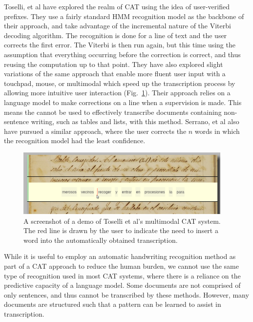 \documentclass[ms]{byuprop}
\begin{document}
Toselli, et al\cite{Toselli2007} have explored the realm of CAT using the idea of user-verified prefixes. They use a fairly standard HMM recognition model as the backbone of their approach, and take advantage of the incremental nature of the Viterbi decoding algorithm. The recognition is done for a line of text and the user corrects the first error. The Viterbi is then run again, but this time using the assumption that everything occurring before the correction is correct, and thus reusing the computation up to that point. They have also explored slight variations of the same approach that enable more fluent user input with a touchpad\cite{Toselli2008}, mouse\cite{Toselli2009}, or multimodal\cite{Toselli2010} which speed up the transcription process by allowing more intuitive user interaction (Fig.~\ref{fig:Toselli_multimodalCAT}). Their approach relies on a language model to make corrections on a line when a supervision is made. This means the cannot be used to effectively transcribe documents containing non-sentence writing, such as tables and lists, with this method. Serrano, et al also have pursued a similar approach, where the user corrects the $n$ words in which the recognition model had the least confidence\cite{Serrano2014}.

\begin{figure}[h]
    \centering
    \includegraphics[width=0.95\textwidth]{Toselli_multimodalCAT}
    \caption{A screenshot of a demo of Toselli et al's multimodal CAT system. The red line is drawn by the user to indicate the need to insert a word into the automatically obtained transcription.}
    \label{fig:Toselli_multimodalCAT}
\end{figure}

While it is useful to employ an automatic handwriting recognition method as part of a CAT approach to reduce the human burden, we cannot use the same type of recognition used in most CAT systems, where there is a reliance on the predictive capacity of a language model. Some documents are not comprised of only sentences, and thus cannot be transcribed by these methods. However, many documents are structured such that a pattern can be learned to assist in transcription.
\end{document}
